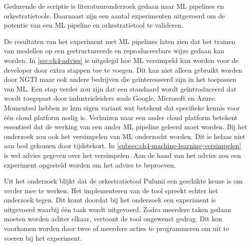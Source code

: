 Gedurende de scriptie is literatuuronderzoek gedaan naar ML pipelines en orkestratietools. Daarnaast zijn een aantal experimenten uitgevoerd om de potentie van een ML pipeline en orkestratietool te valideren. 

De resultaten van het experiment met ML pipelines laten zien dat het trainen van modellen op een gestructureerde en reproduceerbare wijze gedaan kan worden. In \autoref{sec:ch4-advies} is uitgelegd hoe ML versimpeld kan worden voor de developer door extra stappen toe te voegen. Dit kan niet alleen gebruikt worden door NGTI maar ook andere bedrijven die geïnteresseerd zijn in het toepassen van ML. Een stap verder zou zijn dat een standaard wordt geïntroduceerd dat wordt toegepast door industrieleiders zoals Google, Microsoft en Azure. Momenteel hebben ze hun eigen variant wat betekent dat specifieke kennis voor één cloud platform nodig is. Verhuizen naar een ander cloud platform betekent essentieel dat de werking van een ander ML pipeline geleerd moet worden. Bij het onderzoek zou ook het versimpelen van ML onderzocht worden. Dit is helaas niet aan bod gekomen door tijdstekort. In \autoref{subsec:ch4-machine-learning-versimpelen} is wel advies gegeven over het versimpelen. Aan de hand van het advies zou een experiment opgesteld worden om het advies te beproeven.

Uit het onderzoek blijkt dat de orkestratietool Pulumi een geschikte keuze is om verder mee te werken. Het implementeren van de tool spreekt echter het onderzoek tegen. Dit komt doordat bij het onderzoek een experiment is uitgevoerd waarbij één taak wordt uitgevoerd. Zodra meerdere taken gedaan moeten worden achter elkaar, vertoont de tool ongewenst gedrag. Dit kon voorkomen worden door twee of meerdere acties te programmeren om uit te voeren bij het experiment.